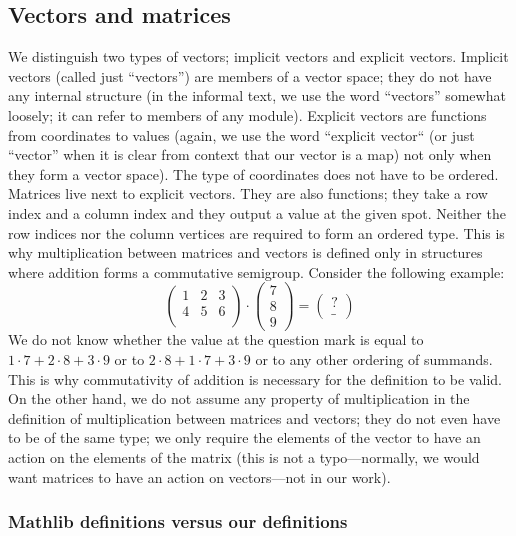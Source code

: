 \documentclass[]{article}
\renewcommand{\.}{\hskip .75pt}
\let\*=\cdot
\begin{document}
\subsection{Vectors and matrices}

We distinguish two types of vectors; implicit vectors and explicit vectors.
Implicit vectors (called just ``vectors'') are members of a vector space;
they do not have any internal structure
(in the informal text, we use the word ``vectors'' somewhat loosely;
it can refer to members of any module).
Explicit vectors are functions from coordinates to values (again, we use the word
``explicit vector`` (or just ``vector'' when it is clear from context that our vector
is a map) not only when they form a vector space).
The type of coordinates does not have to be ordered.
Matrices live next to explicit vectors. They are also functions; they take a row index
and a column index and they output a value at the given spot.
Neither the row indices nor the column vertices are required to form an ordered type.
This is why multiplication between matrices and vectors is defined only in structures
where addition forms a commutative semigroup. Consider the following example:
$$
\begin{pmatrix}
	1 & 2 & 3 \\
	4 & 5 & 6 \\
\end{pmatrix}
\*
\begin{pmatrix}
	7 \\ 8 \\ 9
\end{pmatrix}
=
\begin{pmatrix}
	? \\ \_
\end{pmatrix}
$$
We do not know whether the value at the question mark is equal to
$ 1 \* 7 + 2 \* 8 + 3 \* 9 $ or to
$ 2 \* 8 + 1 \* 7 + 3 \* 9 $ or to
any other ordering of summands.
This is why commutativity of addition is necessary for the definition to be valid.
On the other hand, we do not assume any property of multiplication in the
definition of multiplication between matrices and vectors; they do not even
have to be of the same type; we only require the elements of the vector
to have an action on the elements of the matrix (this is not a typo\:---\:normally,
we would want matrices to have an action on vectors\:---\:not in our work).

\subsubsection{Mathlib definitions versus our definitions}
\end{document}
